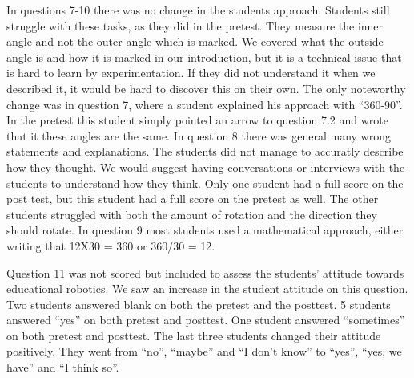 \bigskip\noindent
In questions 7-10 there was no change in the students approach. Students still struggle with these tasks, as they did in the pretest. They measure the inner angle and not the outer angle which is marked. We covered what the outside angle is and how it is marked in our introduction, but it is a technical issue that is hard to learn by experimentation. If they did not understand it when we described it, it would be hard to discover this on their own. The only noteworthy change was in question 7, where a student explained his approach with ``360-90''. In the pretest this student simply pointed an arrow to question 7.2 and wrote that it these angles are the same. In question 8 there was general many wrong statements and explanations. The students did not manage to accuratly describe how they thought. We would suggest having conversations or interviews with the students to understand how they think. Only one student had a full score on the post test, but this student had a full score on the pretest as well. The other students struggled with both the amount of rotation and the direction they should rotate. In question 9 most students used a mathematical approach, either writing that 12X30 = 360 or 360/30 = 12. 

\bigskip\noindent
Question 11 was not scored but included to assess the students' attitude towards educational robotics. We saw an increase in the student attitude on this question. Two students answered blank on both the pretest and the posttest. 5 students answered ``yes'' on both pretest and posttest. One student answered ``sometimes'' on both pretest and posttest. The last three students changed their attitude positively. They went from ``no'', ``maybe'' and ``I don't know'' to ``yes'', ``yes, we have'' and ``I think so''.
